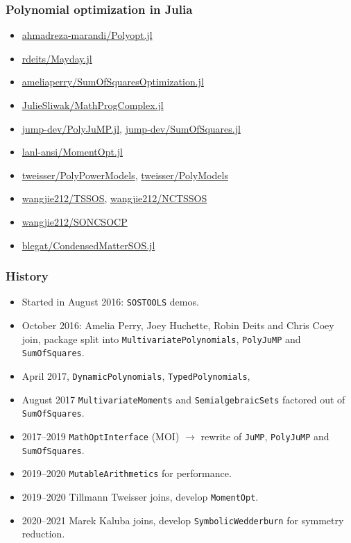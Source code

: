 \documentclass{beamer}
\newcommand{\citefoot}[1]{\footnote{\tiny #1}}
\begin{document}
\begin{frame}
  \frametitle{Polynomial optimization in Julia}
  \begin{itemize}
    \item \url{ahmadreza-marandi/Polyopt.jl}%
    \item \url{rdeits/Mayday.jl}
    \item \url{ameliaperry/SumOfSquaresOptimization.jl}
    \item \url{JulieSliwak/MathProgComplex.jl}%
    \item \url{jump-dev/PolyJuMP.jl}, \url{jump-dev/SumOfSquares.jl}
    \item \url{lanl-ansi/MomentOpt.jl}
    \item \url{tweisser/PolyPowerModels}, \url{tweisser/PolyModels}
    \item \url{wangjie212/TSSOS}, \url{wangjie212/NCTSSOS}
    \item \url{wangjie212/SONCSOCP}
    \item \url{blegat/CondensedMatterSOS.jl}
  \end{itemize}
\end{frame}
\begin{frame}
  \frametitle{History}
  \begin{itemize}
    \item Started in August 2016: \texttt{SOSTOOLS} demos.
    \item October 2016: Amelia Perry, Joey Huchette, Robin Deits and Chris Coey \alert{join},
      package \alert{split} into \texttt{MultivariatePolynomials}, \texttt{PolyJuMP} and \texttt{SumOfSquares}.
    \item April 2017, \texttt{DynamicPolynomials}, \texttt{TypedPolynomials},
    \item August 2017 \texttt{MultivariateMoments} and \texttt{SemialgebraicSets} \alert{factored out} of \texttt{SumOfSquares}.
    \item 2017--2019 \texttt{MathOptInterface} (MOI) $\to$ \alert{rewrite} of \texttt{JuMP}, \texttt{PolyJuMP} and \texttt{SumOfSquares}.
    \item 2019--2020 \texttt{MutableArithmetics} for \alert{performance}.
    \item 2019--2020 Tillmann Tweisser \alert{joins}, develop \texttt{MomentOpt}.
    \item 2020--2021 Marek Kaluba \alert{joins}, develop \texttt{SymbolicWedderburn} for symmetry reduction.
  \end{itemize}
\end{frame}
\end{document}
